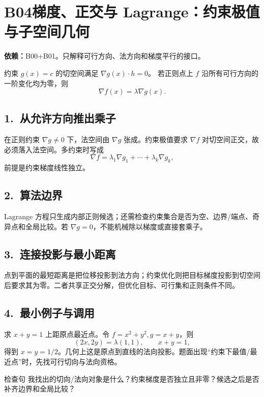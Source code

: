 \documentclass[UTF8,a4paper,10pt]{ctexart}
\begin{document}
\section*{B04\quad 梯度、正交与 Lagrange：约束极值与子空间几何}
\textbf{依赖：}B00+B01。只解释可行方向、法方向和梯度平行的接口。
\begin{tcolorbox}[title=母接口]
约束 $g(x)=c$ 的切空间满足 $\nabla g(x)\cdot h=0$。
若正则点上 $f$ 沿所有可行方向的一阶变化均为零，则
\[
\nabla f(x)=\lambda\nabla g(x).
\]
\end{tcolorbox}
\subsection*{1.\ 从允许方向推出乘子}
在正则约束 $\nabla g\ne0$ 下，法空间由 $\nabla g$ 张成。约束极值要求 $\nabla f$ 对切空间正交，故必须落入法空间。多约束时写成
\[
\nabla f=\lambda_1\nabla g_1+\cdots+\lambda_k\nabla g_k,
\]
前提是约束梯度线性独立。
\subsection*{2.\ 算法边界}
Lagrange 方程只生成内部正则候选；还需检查约束集合是否为空、边界/端点、奇异点和全局比较。若 $\nabla g=0$，不能机械除以梯度或直接套乘子。
\subsection*{3.\ 连接投影与最小距离}
点到平面的最短距离是把位移投影到法方向；约束优化则把目标梯度投影到切空间后要求其为零。二者共享正交分解，但优化目标、可行集和正则条件不同。
\subsection*{4.\ 最小例子与调用}
求 $x+y=1$ 上距原点最近点。令 $f=x^2+y^2,g=x+y$，则
\[
(2x,2y)=\lambda(1,1),\qquad x+y=1,
\]
得到 $x=y=1/2$。几何上这是原点到直线的法向投影。题面出现“约束下最值/最近点”时，先找可行切向与法向资格。
\begin{corebox}{检查句}
我找出的切向/法向对象是什么？约束梯度是否独立且非零？候选之后是否补齐边界和全局比较？
\end{corebox}
\end{document}
